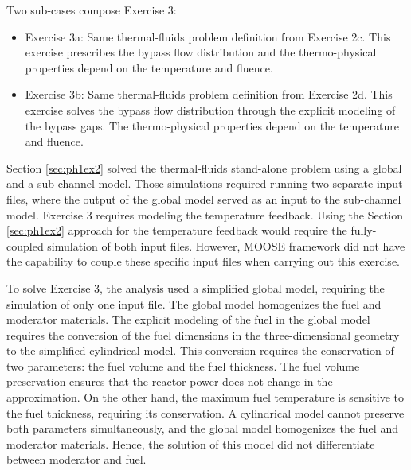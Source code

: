 Two sub-cases compose Exercise 3:
\begin{itemize}
  \item Exercise 3a: Same thermal-fluids problem definition from Exercise 2c. This exercise prescribes the bypass flow distribution and the thermo-physical properties depend on the temperature and fluence.
  \item Exercise 3b: Same thermal-fluids problem definition from Exercise 2d. This exercise solves the bypass flow distribution through the explicit modeling of the bypass gaps. The thermo-physical properties depend on the temperature and fluence.
\end{itemize}

Section \ref{sec:ph1ex2} solved the thermal-fluids stand-alone problem using a global and a sub-channel model.
Those simulations required running two separate input files, where the output of the global model served as an input to the sub-channel model.
Exercise 3 requires modeling the temperature feedback.
Using the Section \ref{sec:ph1ex2} approach for the temperature feedback would require the fully-coupled simulation of both input files.
However, MOOSE framework did not have the capability to couple these specific input files when carrying out this exercise.

To solve Exercise 3, the analysis used a simplified global model, requiring the simulation of only one input file.
The global model homogenizes the fuel and moderator materials.
The explicit modeling of the fuel in the global model requires the conversion of the fuel dimensions in the three-dimensional geometry to the simplified cylindrical model.
This conversion requires the conservation of two parameters: the fuel volume and the fuel thickness.
The fuel volume preservation ensures that the reactor power does not change in the approximation.
On the other hand, the maximum fuel temperature is sensitive to the fuel thickness, requiring its conservation.
A cylindrical model cannot preserve both parameters simultaneously, and the global model homogenizes the fuel and moderator materials.
Hence, the solution of this model did not differentiate between moderator and fuel.

